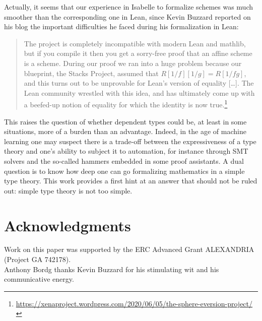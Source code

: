 \documentclass[12pt]{scrartcl}
\begin{document}
Actually, it seems that our experience in Isabelle to formalize schemes was much smoother than the corresponding one in Lean, since Kevin Buzzard reported on his blog the important difficulties he faced during his formalization in Lean:
\begin{quote}
	The project is completely incompatible with modern Lean and mathlib, but if you compile it then you get a sorry-free proof that an affine scheme is a scheme. During our proof we ran into a huge problem because our blueprint, the Stacks Project, assumed that $R[1/f][1/g]=R[1/fg]$, and this turns out to be unprovable for Lean’s version of equality [\dots]. The Lean community wrestled with this idea, and has ultimately come up with a beefed-up notion of equality for which the identity is now true.\footnote{\url{https://xenaproject.wordpress.com/2020/06/05/the-sphere-eversion-project/}}
\end{quote}	
This raises the question of whether dependent types could be, at least in some situations, more of a burden than an advantage. Indeed, in the age of machine learning one may suspect there is a trade-off between the expressiveness of a type theory and one's ability to subject it to automation, for instance through SMT solvers and the so-called hammers embedded in some proof assistants. A dual question is to know how deep one can go formalizing mathematics in a simple type theory. This work provides a first hint at an answer that should not be ruled out: simple type theory is not too simple.       

\section*{Acknowledgments}

Work on this paper was supported by the ERC Advanced Grant ALEXANDRIA (Project GA 742178).  \\
Anthony Bordg thanks Kevin Buzzard for his stimulating wit and his communicative energy.			
\end{document}
